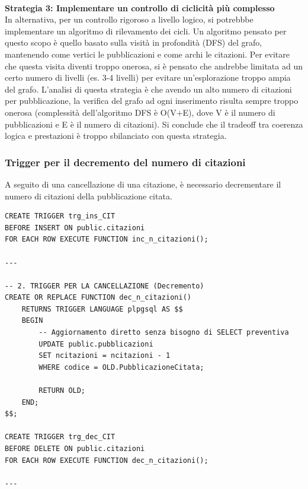 \documentclass[a4paper,12pt]{article}
\begin{document}
\\ \textbf{Strategia 3: Implementare un controllo di ciclicità più complesso}
\\ In alternativa, per un controllo rigoroso a livello logico, si potrebbbe implementare un algoritmo di rilevamento dei cicli. Un algoritmo pensato per questo scopo è quello basato sulla visità in profondità (DFS) del grafo, mantenendo come vertici le pubblicazioni e come archi le citazioni. Per evitare che questa visita diventi troppo onerosa, si è pensato che andrebbe limitata ad un certo numero di livelli (es. 3-4 livelli) per evitare un'esplorazione troppo ampia del grafo. L'analisi di questa strategia è che avendo un alto numero di citazioni per pubblicazione, la verifica del grafo ad ogni inserimento risulta sempre troppo onerosa (complessità dell'algoritmo DFS è O(V+E), dove V è il numero di pubblicazioni e E è il numero di citazioni). Si conclude che il tradeoff tra coerenza logica e prestazioni è troppo sbilanciato con questa strategia.

\subsubsection{Trigger per il decremento del numero di citazioni}
A seguito di una cancellazione di una citazione, è necessario decrementare il numero di citazioni della pubblicazione citata. 
\begin{lstlisting}
CREATE TRIGGER trg_ins_CIT
BEFORE INSERT ON public.citazioni
FOR EACH ROW EXECUTE FUNCTION inc_n_citazioni();

---

-- 2. TRIGGER PER LA CANCELLAZIONE (Decremento)
CREATE OR REPLACE FUNCTION dec_n_citazioni()
    RETURNS TRIGGER LANGUAGE plpgsql AS $$
    BEGIN
        -- Aggiornamento diretto senza bisogno di SELECT preventiva
        UPDATE public.pubblicazioni
        SET ncitazioni = ncitazioni - 1
        WHERE codice = OLD.PubblicazioneCitata;
        
        RETURN OLD;
    END;
$$;

CREATE TRIGGER trg_dec_CIT
BEFORE DELETE ON public.citazioni
FOR EACH ROW EXECUTE FUNCTION dec_n_citazioni();

---
\end{lstlisting}
\end{document}

